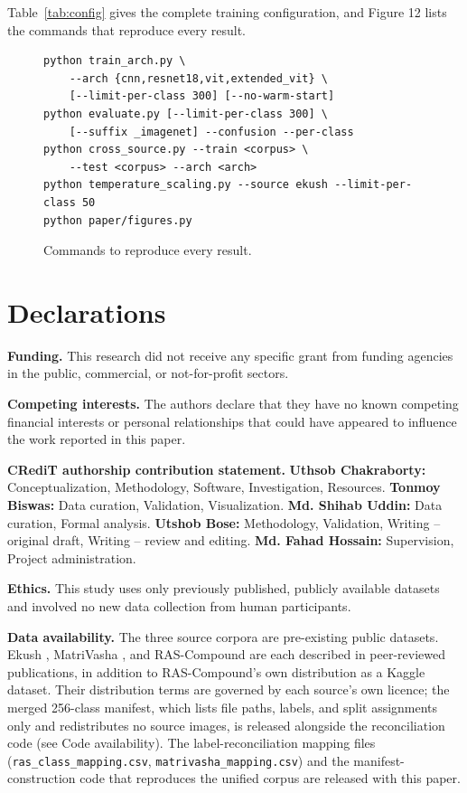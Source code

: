 Table~\ref{tab:config} gives the complete training configuration, and Figure 12 lists the commands that reproduce every result.

\begin{figure}[htbp]
\centering
\small
\begin{verbatim}
python train_arch.py \
    --arch {cnn,resnet18,vit,extended_vit} \
    [--limit-per-class 300] [--no-warm-start]
python evaluate.py [--limit-per-class 300] \
    [--suffix _imagenet] --confusion --per-class
python cross_source.py --train <corpus> \
    --test <corpus> --arch <arch>
python temperature_scaling.py --source ekush --limit-per-class 50
python paper/figures.py
\end{verbatim}
\caption{Commands to reproduce every result.}
\end{figure}

\hypertarget{declarations}{%
\section{Declarations}\label{declarations}}

\textbf{Funding.} This research did not receive any specific grant from funding agencies in the public, commercial, or not-for-profit sectors.

\textbf{Competing interests.} The authors declare that they have no known competing financial interests or personal relationships that could have appeared to influence the work reported in this paper.

\textbf{CRediT authorship contribution statement.} \textbf{Uthsob Chakraborty:} Conceptualization, Methodology, Software, Investigation, Resources. \textbf{Tonmoy Biswas:} Data curation, Validation, Visualization. \textbf{Md. Shihab Uddin:} Data curation, Formal analysis. \textbf{Utshob Bose:} Methodology, Validation, Writing -- original draft, Writing -- review and editing. \textbf{Md. Fahad Hossain:} Supervision, Project administration.

\textbf{Ethics.} This study uses only previously published, publicly available datasets and involved no new data collection from human participants.

\textbf{Data availability.} The three source corpora are pre-existing
public datasets. Ekush \citep{ref29}, MatriVasha \citep{ref49}, and
RAS-Compound \citep{ref50} are each described in peer-reviewed
publications, in addition to RAS-Compound's own distribution as a
Kaggle dataset. Their distribution terms are governed by each source's
own licence; the merged 256-class manifest, which lists file paths, labels, and split assignments only and redistributes no source images, is released alongside the reconciliation code (see Code availability). The
label-reconciliation mapping files (\texttt{ras\_class\_mapping.csv},
\texttt{matrivasha\_mapping.csv}) and the manifest-construction code
that reproduces the unified corpus are released with this paper.

